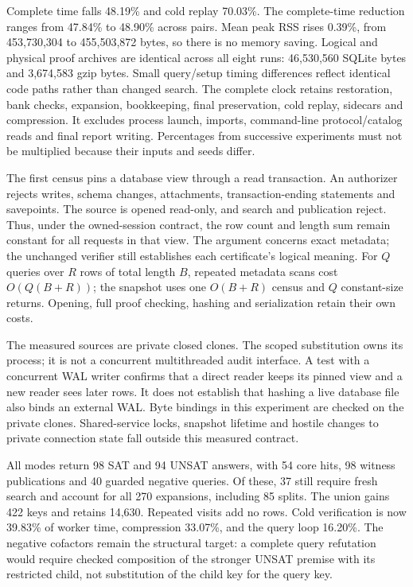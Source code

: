 \documentclass[11pt,a4paper]{article}
\numberwithin{equation}{section}
\theoremstyle{plain}
\theoremstyle{definition}
\theoremstyle{remark}
\begin{document}
Complete time falls 48.19\% and cold replay 70.03\%. The complete-time reduction
ranges from 47.84\% to 48.90\% across pairs. Mean peak RSS rises 0.39\%, from
453,730,304 to 455,503,872 bytes, so there is no memory saving. Logical and
physical proof archives are identical across all eight runs: 46,530,560 SQLite
bytes and 3,674,583 gzip bytes. Small query/setup timing differences reflect
identical code paths rather than changed search. The complete clock retains
restoration, bank checks, expansion, bookkeeping, final preservation, cold
replay, sidecars and compression. It excludes process launch, imports,
command-line protocol/catalog reads and final report writing. Percentages from
successive experiments must not be multiplied because their inputs and seeds differ.

The first census pins a database view through a read transaction. An authorizer
rejects writes, schema changes, attachments, transaction-ending statements and
savepoints. The source is opened read-only, and search and publication reject.
Thus, under the owned-session contract, the row count and length sum remain
constant for all requests in that view. The argument concerns exact metadata;
the unchanged verifier still establishes each certificate's logical meaning.
For $Q$ queries over $R$ rows of total length $B$, repeated metadata scans cost
$O(Q(B+R))$; the snapshot uses one $O(B+R)$ census and $Q$ constant-size returns.
Opening, full proof checking, hashing and serialization retain their own costs.

The measured sources are private closed clones. The scoped substitution owns
its process; it is not a concurrent multithreaded audit interface. A test with a
concurrent WAL writer confirms that a direct reader keeps its pinned view and
a new reader sees later rows. It does not establish that hashing a live database
file also binds an external WAL. Byte bindings in this experiment are checked
on the private clones. Shared-service locks, snapshot lifetime and hostile
changes to private connection state fall outside this measured contract.

All modes return 98 SAT and 94 UNSAT answers, with 54 core hits, 98 witness
publications and 40 guarded negative queries. Of these, 37 still require fresh
search and account for all 270 expansions, including 85 splits. The union gains
422 keys and retains 14,630. Repeated visits add no rows. Cold verification is
now 39.83\% of worker time, compression 33.07\%, and the query loop 16.20\%.
The negative cofactors remain the structural target: a complete query refutation
would require checked composition of the stronger UNSAT premise with its
restricted child, not substitution of the child key for the query key.
\end{document}
